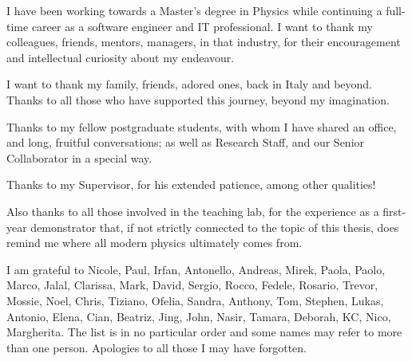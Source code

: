 I have been working towards a Master's degree in Physics
while continuing a full-time career as a software engineer and IT professional. 
I want to thank my colleagues, friends, mentors, managers, in that industry,
for their encouragement and intellectual curiosity about my endeavour. 

I want to thank my family, friends, adored ones, back in Italy and beyond.
Thanks to all those who have supported this journey, beyond my imagination.

Thanks to my fellow postgraduate students, with whom I have shared
an office, and long, fruitful conversations;
as well as Research Staff, and our Senior Collaborator in a special way. 

Thanks to my Supervisor, for his extended patience, among other qualities!

Also thanks to all those involved in the teaching lab, 
for the experience as a first-year demonstrator that, 
if not strictly connected to the topic of this thesis, 
does remind me where all modern physics ultimately comes from.

I am grateful to Nicole, Paul, Irfan, Antonello, Andreas, Mirek, Paola, Paolo, Marco,
Jalal, Clarissa, Mark, David, Sergio, Rocco, Fedele, Rosario, Trevor, Mossie, Noel, Chris, Tiziano, Ofelia,
Sandra, Anthony, Tom, Stephen, Lukas, Antonio, Elena, Cian, Beatriz, Jing, John, Nasir, Tamara, 
Deborah, KC, Nico, Margherita. The list is in no particular order and some names may refer to more than one person.
Apologies to all those I may have forgotten.
